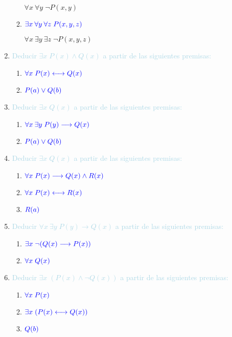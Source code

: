 \documentclass[12pt]{article}
\newcommand{\lb}[1]{\textcolor{lightblue}{#1}}
\newcommand{\db}[1]{\textcolor{blue}{#1}}
\begin{document}
\begin{enumerate}[label=\color{red}\textbf{\arabic*)}, leftmargin=*]
\begin{enumerate}[label=\color{red}\alph*)]
            $\forall x\:\forall y\;\neg P(x,y)$
            \item $\db{\exists x\:\forall y\:\forall z\;P(x,y,z)}$
            
            $\forall x\:\exists y\:\exists z\;\neg P(x,y,z)$
      \end{enumerate}
      \item \lb{Deducir $\exists x\;P(x)\wedge Q(x)$ a partir de las siguientes premisas:}
      \begin{enumerate}[label=\color{red}\alph*)]
            \item $\db{\forall x\;P(x)\longleftrightarrow Q(x)}$
            \item $\db{P(a)\vee Q(b)}$
      \end{enumerate}
      \item \lb{Deducir $\exists x\;Q(x)$ a partir de las siguientes premisas:}
      \begin{enumerate}[label=\color{red}\alph*)]
            \item $\db{\forall x\:\exists y\;P(y)\longrightarrow Q(x)}$
            \item $\db{P(a)\vee Q(b)}$
      \end{enumerate}
      \item \lb{Deducir $\exists x\;Q(x)$ a partir de las siguientes premisas:}
      \begin{enumerate}[label=\color{red}\alph*)]
            \item $\db{\forall x\;P(x)\longrightarrow Q(x)\wedge R(x)}$
            \item $\db{\forall x\; P(x)\longleftrightarrow R(x)}$
            \item $\db{R(a)}$
      \end{enumerate}
      \item \lb{Deducir $\forall x\:\exists y\;P(y)\longrightarrow Q(x)$ a partir de las siguientes premisas:}
      \begin{enumerate}[label=\color{red}\alph*)]
            \item $\db{\exists x\;\neg(Q(x)\longrightarrow P(x))}$
            \item $\db{\forall x\;Q(x)}$
      \end{enumerate}
      \item \lb{Deducir $\exists x\;(P(x)\wedge\neg Q(x))$ a partir de las siguientes premisas:}
      \begin{enumerate}[label=\color{red}\alph*)]
            \item $\db{\forall x\;P(x)}$
            \item $\db{\exists x\;(P(x)\longleftrightarrow Q(x))}$
            \item $\db{Q(b)}$
      \end{enumerate}
\end{enumerate}
\newpage
\end{document}
